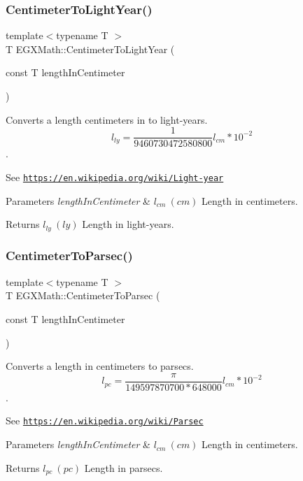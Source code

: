 \subsubsection{\texorpdfstring{Centimeter\+To\+Light\+Year()}{CentimeterToLightYear()}}
{\footnotesize\ttfamily template$<$typename T $>$ \\
T E\+G\+X\+Math\+::\+Centimeter\+To\+Light\+Year (\begin{DoxyParamCaption}\item[{const T}]{length\+In\+Centimeter }\end{DoxyParamCaption})}



Converts a length centimeters in to light-\/years. \[ l_{ly}= \frac{1}{9460730472580800} l_{cm} * 10^{-2} \]. 

See \href{https://en.wikipedia.org/wiki/Light-year}{\tt https\+://en.\+wikipedia.\+org/wiki/\+Light-\/year} 
\begin{DoxyParams}{Parameters}
{\em length\+In\+Centimeter} & $ l_{cm}\ (cm)$ Length in centimeters. \\
\hline
\end{DoxyParams}
\begin{DoxyReturn}{Returns}
$ l_{ly}\ (ly)$ Length in light-\/years. 
\end{DoxyReturn}
\mbox{\label{group___e_g_x_math-_conversions-_length_conversions-_centimeter-_astronomical_ga9e28cd6f9d5da2330cd5bf17af20cc8f}} 
\subsubsection{\texorpdfstring{Centimeter\+To\+Parsec()}{CentimeterToParsec()}}
{\footnotesize\ttfamily template$<$typename T $>$ \\
T E\+G\+X\+Math\+::\+Centimeter\+To\+Parsec (\begin{DoxyParamCaption}\item[{const T}]{length\+In\+Centimeter }\end{DoxyParamCaption})}



Converts a length in centimeters to parsecs. \[ l_{pc}=\frac{\pi}{149597870700 * 648000} l_{cm} * 10^{-2} \]. 

See \href{https://en.wikipedia.org/wiki/Parsec}{\tt https\+://en.\+wikipedia.\+org/wiki/\+Parsec} 
\begin{DoxyParams}{Parameters}
{\em length\+In\+Centimeter} & $ l_{cm}\ (cm)$ Length in centimeters. \\
\hline
\end{DoxyParams}
\begin{DoxyReturn}{Returns}
$ l_{pc}\ (pc)$ Length in parsecs. 
\end{DoxyReturn}
